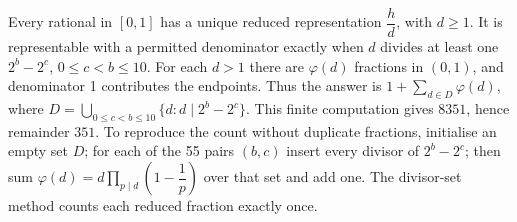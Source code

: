 Every rational in $[0,1]$ has a unique reduced representation $\dfrac{h}{d}$, with $d\ge1$. It is representable with a permitted denominator exactly when $d$ divides at least one $2^b-2^c$, $0\le c<b\le10$. For each $d>1$ there are $\varphi(d)$ fractions in $(0,1)$, and denominator 1 contributes the endpoints. Thus the answer is $1+\sum_{d\in D}\varphi(d)$, where $D=\bigcup_{0\le c<b\le10}\{d:d\mid2^b-2^c\}$. This finite computation gives $8351$, hence remainder $\boxed{351}$. To reproduce the count without duplicate fractions, initialise an empty set $D$; for each of the 55 pairs $(b,c)$ insert every divisor of $2^b-2^c$; then sum $\varphi (d) = d \prod_{p\mid d} (1 - \dfrac{1}{p})$ over that set and add one. The divisor-set method counts each reduced fraction exactly once.

